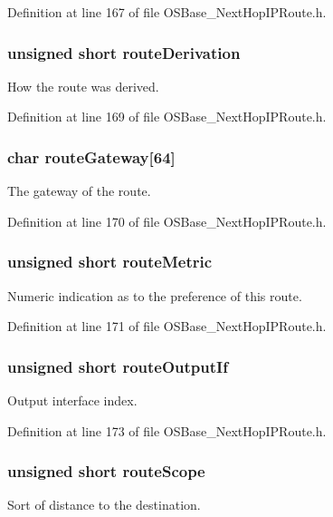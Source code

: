 Definition at line 167 of file OSBase\_\-NextHopIPRoute.h.\hypertarget{structnext_hop_i_p_a8583bb9966409b3475e17018f7cd2ffe}{
\subsubsection[{routeDerivation}]{\setlength{\rightskip}{0pt plus 5cm}unsigned short {\bf routeDerivation}}}
\label{structnext_hop_i_p_a8583bb9966409b3475e17018f7cd2ffe}
How the route was derived. 

Definition at line 169 of file OSBase\_\-NextHopIPRoute.h.\hypertarget{structnext_hop_i_p_abbb06e355ffd8bd5620c54933f25d88f}{
\subsubsection[{routeGateway}]{\setlength{\rightskip}{0pt plus 5cm}char {\bf routeGateway}\mbox{[}64\mbox{]}}}
\label{structnext_hop_i_p_abbb06e355ffd8bd5620c54933f25d88f}
The gateway of the route. 

Definition at line 170 of file OSBase\_\-NextHopIPRoute.h.\hypertarget{structnext_hop_i_p_a7e5ee4285946aa5ddcec79280451324c}{
\subsubsection[{routeMetric}]{\setlength{\rightskip}{0pt plus 5cm}unsigned short {\bf routeMetric}}}
\label{structnext_hop_i_p_a7e5ee4285946aa5ddcec79280451324c}
Numeric indication as to the preference of this route. 

Definition at line 171 of file OSBase\_\-NextHopIPRoute.h.\hypertarget{structnext_hop_i_p_a1adf02684891a082470b3a10021902f7}{
\subsubsection[{routeOutputIf}]{\setlength{\rightskip}{0pt plus 5cm}unsigned short {\bf routeOutputIf}}}
\label{structnext_hop_i_p_a1adf02684891a082470b3a10021902f7}
Output interface index. 

Definition at line 173 of file OSBase\_\-NextHopIPRoute.h.\hypertarget{structnext_hop_i_p_a6a7d3b876bf469fad2abd9845de6171d}{
\subsubsection[{routeScope}]{\setlength{\rightskip}{0pt plus 5cm}unsigned short {\bf routeScope}}}
\label{structnext_hop_i_p_a6a7d3b876bf469fad2abd9845de6171d}
Sort of distance to the destination. 

